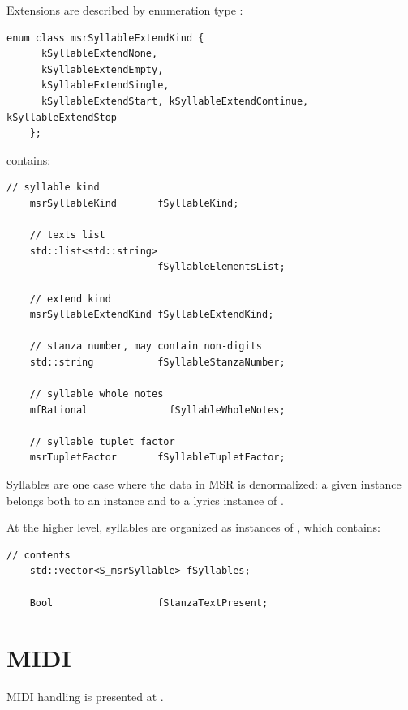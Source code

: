 Extensions are described by enumeration type {\tt }:
\begin{lstlisting}[language=CPlusPlus]
    enum class msrSyllableExtendKind {
      kSyllableExtendNone,
      kSyllableExtendEmpty,
      kSyllableExtendSingle,
      kSyllableExtendStart, kSyllableExtendContinue, kSyllableExtendStop
    };
\end{lstlisting}

 contains:
\begin{lstlisting}[language=CPlusPlus]
    // syllable kind
    msrSyllableKind       fSyllableKind;

    // texts list
    std::list<std::string>
                          fSyllableElementsList;

    // extend kind
    msrSyllableExtendKind fSyllableExtendKind;

    // stanza number, may contain non-digits
    std::string           fSyllableStanzaNumber;

    // syllable whole notes
    mfRational              fSyllableWholeNotes;

    // syllable tuplet factor
    msrTupletFactor       fSyllableTupletFactor;
\end{lstlisting}

Syllables are one case where the data in MSR is denormalized: a given  instance belongs both to an  instance and to a lyrics instance of .

At the higher level, syllables are organized as instances of , which contains:
\begin{lstlisting}[language=CPlusPlus]
    // contents
    std::vector<S_msrSyllable> fSyllables;

    Bool                  fStanzaTextPresent;
\end{lstlisting}


\section{MIDI}\label{MIDI}

MIDI handling is presented at .
